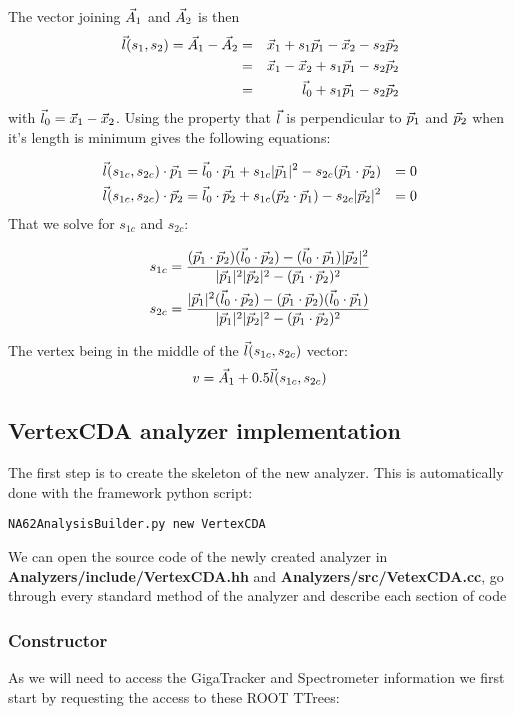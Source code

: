 \documentclass{article}
\renewcommand{\path}[1]{\textbf{#1}}
\begin{document}
The vector joining $\vec{A}_{1}$ and $\vec{A}_{2}$ is then
\begin{eqnarray}
	\vec{l}(s_1,s_2)=\vec{A}_{1}-\vec{A}_{2} &=& \vec{x}_{1}+s_1\vec{p}_{1} - \vec{x}_{2} - s_2\vec{p}_{2}\\
	&=& \vec{x}_{1}-\vec{x}_{2} + s_1\vec{p}_{1} - s_2\vec{p}_{2}\\
	&=& \vec{l}_{0} + s_1\vec{p}_{1} - s_2\vec{p}_{2}
\end{eqnarray}
with $\vec{l}_{0} = \vec{x}_{1}-\vec{x}_{2}$. Using the property that $\vec{l}$ is perpendicular to
$\vec{p}_{1}$ and $\vec{p}_{2}$ when it's length is minimum gives the following
equations:

\begin{align}
	\vec{l}(s_{1c},s_{2c})\cdot\vec{p}_{1} &= \vec{l}_{0}\cdot\vec{p}_{1} + s_{1c}|\vec{p}_{1}|^2 -
	s_{2c}(\vec{p}_{1}\cdot\vec{p}_{2}) &= 0
	\\
	\vec{l}(s_{1c},s_{2c})\cdot\vec{p}_{2} &= \vec{l}_{0}\cdot\vec{p}_{2} + s_{1c}(\vec{p}_{2}\cdot\vec{p}_{1}) -
	s_{2c}|\vec{p}_{2}|^2 &= 0
\end{align}
That we solve for $s_{1c}$ and $s_{2c}$:

\begin{align}
	s_{1c} &= \frac{(\vec{p}_{1}\cdot\vec{p}_{2})(\vec{l}_{0}\cdot\vec{p}_{2}) -
	(\vec{l}_{0}\cdot\vec{p}_{1})|\vec{p}_{2}|^2}{|\vec{p}_{1}|^2|\vec{p}_{2}|^2 - (\vec{p}_{1}\cdot\vec{p}_{2})^2}\\
	s_{2c} &= \frac{|\vec{p}_{1}|^2(\vec{l}_{0}\cdot\vec{p}_{2}) -
	(\vec{p}_{1}\cdot\vec{p}_{2})(\vec{l}_{0}\cdot\vec{p}_{1})}{|\vec{p}_{1}|^2|\vec{p}_{2}|^2 - (\vec{p}_{1}\cdot\vec{p}_{2})^2}
\end{align}

The vertex being in the middle of the $\vec{l}(s_{1c},s_{2c})$ vector:
\begin{equation}
	v = \vec{A}_{1} + 0.5\vec{l}(s_{1c},s_{2c})
\end{equation}

\subsection{VertexCDA analyzer implementation}
The first step is to create the skeleton of the new analyzer. This is
automatically done with the framework python script:
\begin{lstlisting}
NA62AnalysisBuilder.py new VertexCDA
\end{lstlisting}

We can open the source code of the newly created analyzer in
\path{Analyzers/include/VertexCDA.hh} and \path{Analyzers/src/VetexCDA.cc}, go through
every standard method of the analyzer and describe each section of code

\subsubsection{Constructor}
As we will need to access the GigaTracker and Spectrometer information we first
start by requesting the access to these ROOT TTrees:
\end{document}
